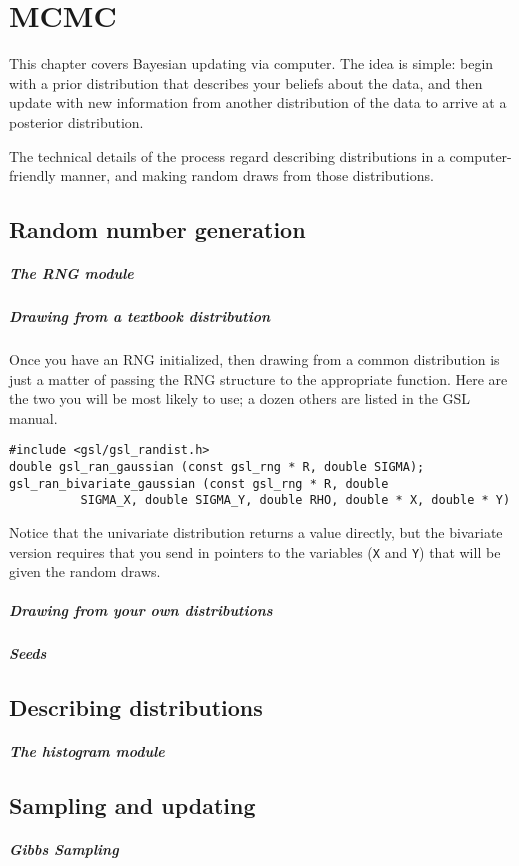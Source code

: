 \chapter{MCMC}

This chapter covers Bayesian updating via computer. The idea is simple: begin with a prior
distribution that describes your beliefs about the data, and then update with new
information from another distribution of the data to arrive at a posterior distribution.

The technical details of the process regard describing distributions
in a computer-friendly manner, and making random draws from those distributions.

\section{Random number generation}

\paragraph{The RNG module}

\paragraph{Drawing from a textbook distribution}
\label{randomnumbers}
Once you have an RNG initialized, then drawing from a common distribution is just a matter
of passing the RNG structure to the appropriate function. Here are the two you will be most
likely to use; a dozen others are listed in the GSL manual.
\begin{verbatim}
#include <gsl/gsl_randist.h>
double gsl_ran_gaussian (const gsl_rng * R, double SIGMA);
gsl_ran_bivariate_gaussian (const gsl_rng * R, double
          SIGMA_X, double SIGMA_Y, double RHO, double * X, double * Y)
\end{verbatim}
Notice that the univariate distribution returns a value directly, but
the bivariate version requires that you send in pointers to the variables
({\tt X} and {\tt Y}) that will be given the random draws.

\paragraph{Drawing from your own distributions}


\paragraph{Seeds}

\section{Describing distributions}

\paragraph{The histogram module}

\section{Sampling and updating}



\paragraph{Gibbs Sampling}

